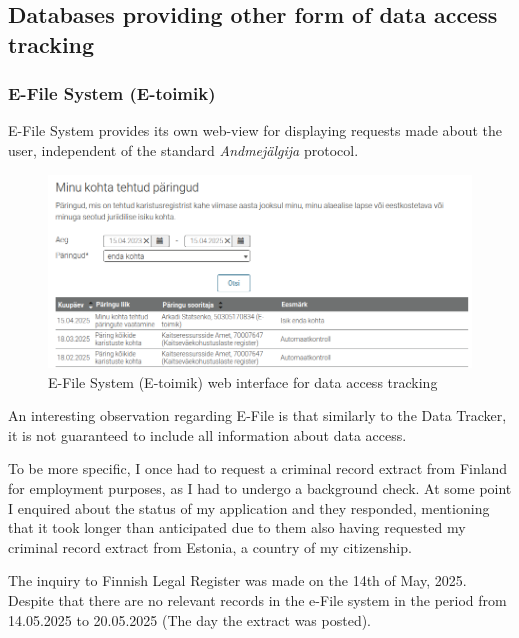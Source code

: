 \subsection{Databases providing other form of data access tracking}

\subsubsection{E-File System (E-toimik)}
E-File System provides its own web-view for displaying requests made about the user, independent of the standard \textit{Andmejälgija} protocol.

\begin{figure}[H]
\centering
\includegraphics[width=450px]{english/figures/e-toimik.png}
\caption{E-File System (E-toimik) web interface for data access tracking\cite{e-toimik-screenshot}}
\label{fig:e-toimik}
\end{figure}

An interesting observation regarding E-File is that similarly to the Data Tracker, it is not guaranteed to include all information about data access.

To be more specific, I once had to request a criminal record extract from Finland for employment purposes, as I had to undergo a background check. At some point I enquired about the status of my application and they responded, mentioning that it took longer than anticipated due to them also having requested my criminal record extract from Estonia, a country of my citizenship.

The inquiry to Finnish Legal Register was made on the 14th of May, 2025. Despite that there are no relevant records in the e-File system in the period from 14.05.2025 to 20.05.2025 (The day the extract was posted).

